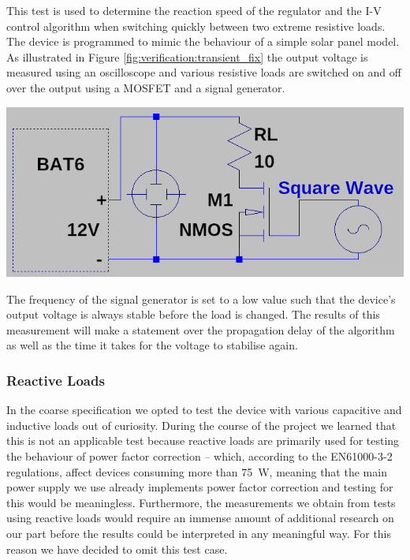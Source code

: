 \begin{minipage}{0.5\textwidth}
    This  test is  used  to  determine the  reaction  speed  of the  regulator
    and  the  I-V  control  algorithm   when  switching  quickly  between  two
    extreme  resistive  loads.    The  device  is  programmed   to  mimic  the
    behaviour  of  a simple  solar  panel  model.   As illustrated  in  Figure
    \ref{fig:verification:transient_fix} the output  voltage is measured using
    an oscilloscope and  various resistive loads are switched on  and off over
    the output using a MOSFET and a signal generator.
\end{minipage}
\begin{minipage}{0.5\textwidth}
    \centering
    \includegraphics[width=.9\textwidth]{images/sim/transient-fixture.png}
    \label{fig:verification:transient_fix}
\end{minipage}

The frequency  of the signal  generator is  set to a  low value such  that the
device's output  voltage is  always stable  before the  load is  changed.  The
results of this  measurement will make a statement over  the propagation delay
of the  algorithm as well as  the time it  takes for the voltage  to stabilise
again.


\subsubsection{Reactive Loads}

In the coarse specification we  opted to test the device with various capacitive
and  inductive  loads  out  of  curiosity. During the course of the  project  we
learned that this is not an applicable test because reactive loads are primarily
used for testing the behaviour of power factor correction -- which, according to
the EN61000-3-2  regulations\cite{ref:pfc},  affect  devices consuming more than
\SI{75}{\watt},  meaning  that  the main power supply we use already implements
power factor correction and testing for this would  be meaningless. Furthermore,
the measurements we obtain  from  tests  using  reactive  loads would require an
immense  amount of additional research on our part before the results  could  be
interpreted in any  meaningful way. For this reason we have decided to omit this
test case.


